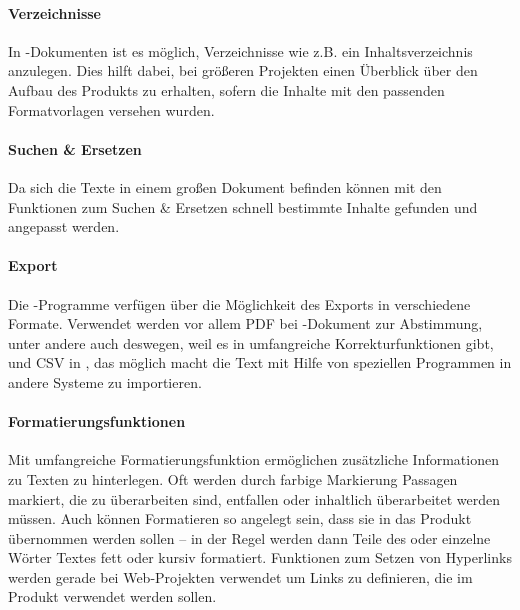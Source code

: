 \paragraph{Verzeichnisse} In -Dokumenten ist es möglich, Verzeichnisse wie z.B. ein Inhaltsverzeichnis anzulegen. Dies hilft dabei, bei größeren Projekten einen Überblick über den Aufbau des Produkts zu erhalten, sofern die Inhalte mit den passenden Formatvorlagen versehen wurden.

\paragraph{Suchen \& Ersetzen} Da sich die Texte in einem großen Dokument befinden können mit den Funktionen zum Suchen \& Ersetzen schnell bestimmte Inhalte gefunden und angepasst werden.

\paragraph{Export} Die -Programme verfügen über die Möglichkeit des Exports in verschiedene Formate. Verwendet werden vor allem PDF bei -Dokument zur Abstimmung, unter andere auch deswegen, weil es in   umfangreiche Korrekturfunktionen gibt, und CSV in , das möglich macht die Text mit Hilfe von speziellen Programmen in andere Systeme zu importieren.

\paragraph{Formatierungsfunktionen} Mit umfangreiche Formatierungsfunktion ermöglichen zusätzliche Informationen zu Texten zu hinterlegen. Oft werden durch farbige Markierung Passagen markiert, die zu überarbeiten sind, entfallen oder inhaltlich überarbeitet werden müssen. Auch können Formatieren so angelegt sein, dass sie in das Produkt übernommen werden sollen -- in der Regel werden dann Teile des oder einzelne Wörter Textes fett oder kursiv formatiert. Funktionen zum Setzen von Hyperlinks werden gerade bei Web-Projekten verwendet um Links zu definieren, die im Produkt verwendet werden sollen.

\bigskip

